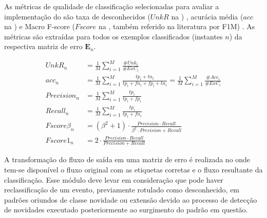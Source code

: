 As métricas de qualidade de classificação selecionadas para avaliar a
implementação do \mfog são
taxa de desconhecidos ($UnkR$ na ) \cite{Faria2013},
acurácia média ($acc$ na )
e Macro F-score ($Fscore$ na , também referido na literatura por
F1M) \cite{Sokolova2009,DaSilva2018thesis}.
As métricas são extraídas para todos os exemplos classificados (instantes $n$)
da respectiva matriz de erro $\mathbf{E}_n$.



\begin{align}
  \mathit{UnkR}_n       &= \frac{1}{M} \sum_{i=1}^{M} \frac{\#Unk_i}{\#ExC_i} \label{eq:unkr} \\
  \mathit{acc}_n        &= \frac{1}{M} \sum_{i=1}^{M} \frac{tp_i + tn_i}{tp_i+fn_i+fp_i+tn_i}
  = \frac{1}{M} \sum_{i=1}^{M} \frac{\#Acc_i}{\#ExC_i}  \label{eq:acc} \\
  \mathit{Precision}_n  &= \frac{1}{M} \sum_{i=1}^{M} \frac{tp_i}{tp_i+fp_i} \\
  \mathit{Recall}_n     &= \frac{1}{M} \sum_{i=1}^{M} \frac{tp_i}{tp_i+fn_i} \\
  \mathit{Fscore}\beta_n &= (\beta^2 +1) \cdot
  \frac{
  \mathit{Precision} \cdot \mathit{Recall}
  }{
    \beta^2 \cdot \mathit{Precision} +\mathit{Recall}
  }\\
  \mathit{Fscore}1_n   &= 2 \cdot \frac{
    \mathit{Precision} \cdot \mathit{Recall}
    }{
      \mathit{Precision} +\mathit{Recall}
    } \label{eq:fscore}
\end{align}


A transformação do fluxo de saída em uma matriz de erro é realizada no \sink
onde tem-se disponível o fluxo original com as etiquetas corretas e o fluxo
resultante da classificação.
Esse módulo deve levar em consideração que pode haver reclassificação de um
evento, previamente rotulado como desconhecido, em padrões oriundos de classe
novidade ou extensão devido ao processo de detecção de novidades executado
posteriormente ao surgimento do padrão em questão.


